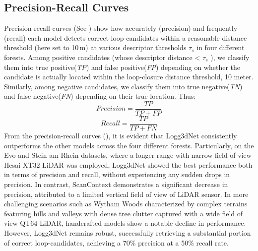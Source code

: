\subsection*{Precision-Recall Curves}
Precision-recall curves (See ) show how accurately (precision) and frequently (recall) each  model detects correct loop candidates within a reasonable distance threshold (here set to 10\,m) at various descriptor thresholds $\tau_{s}$ in four different forests. Among positive candidates   (whose descriptor distance < $\tau_{s}$ ), we classify them into true positive(\emph{TP}) and false positive(\emph{FP}) depending on whether the candidate is actually located within the loop-closure distance threshold, 10 meter. 
Similarly, among negative candidates, we classify them into true negative(\emph{TN}) and false negative(\emph{FN}) depending on their true location. Thus:
\[ Precision = \frac{TP}{TP + FP} \]
\[ Recall = \frac{TP}{TP + FN} \]
From the precision-recall curves (), it is evident that Logg3dNet consistently outperforms the other models across the four different forests. Particularly, on the Evo and Stein am Rhein datasets, where a longer range with narrow field of view Hesai XT32 LiDAR was employed, Logg3dNet showed the best performance both in terms of precision and recall, without experiencing any sudden drops in precision.
In contrast, ScanContext demonstrates a significant decrease in precision, attributed to a limited vertical field of view of LiDAR sensor. In more challenging scenarios such as Wytham Woods characterized by complex terrains featuring hills and valleys with dense tree clutter captured with a wide field of view QT64 LiDAR, handcrafted models show a notable decline in performance. However, Logg3dNet remains robust, successfully retrieving a substantial portion of correct loop-candidates, achieving a 70\% precision at a 50\% recall rate. 

